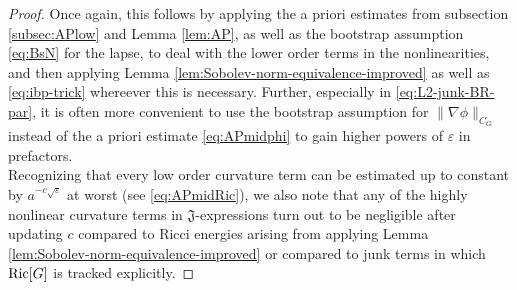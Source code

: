 \documentclass[11pt,leqno,textwidth=10cm]{amsart}
\numberwithin{equation}{section}
\theoremstyle{definition}
\theoremstyle{plain}
\newcommand{\1}{\mathbbm{1}}
\newcommand{\Ric}{\text{\normalfont{Ric}}}
\renewcommand{\epsilon}{\varepsilon}
\newcommand{\todo}[1]{\textcolor{red}{#1}}
\begin{document}
\begin{proof}
Once again, this follows by applying the a priori estimates from subsection \ref{subsec:APlow} and Lemma \ref{lem:AP}, as well as the bootstrap assumption \eqref{eq:BsN} for the lapse, to deal with the lower order terms in the nonlinearities, and then applying Lemma \ref{lem:Sobolev-norm-equivalence-improved} as well as \eqref{eq:ibp-trick} whereever this is necessary. Further, especially in \eqref{eq:L2-junk-BR-par}, it is often more convenient to use the bootstrap assumption for $\|\nabla\phi\|_{C_G}$ instead of the a priori estimate \eqref{eq:APmidphi} to gain higher powers of $\epsilon$ in prefactors. \\
Recognizing that every low order curvature term can be estimated up to constant by $a^{-c\sqrt{\epsilon}}$ at worst (see \eqref{eq:APmidRic}), we also note that any of the highly nonlinear curvature terms in $\mathfrak{J}$-expressions turn out to be negligible after updating $c$ compared to Ricci energies arising from applying Lemma \ref{lem:Sobolev-norm-equivalence-improved} or compared to junk terms in which $\Ric[G]$ is tracked explicitly. %
\end{proof}







\end{document}

